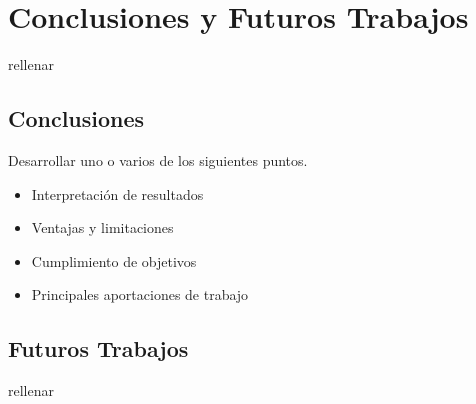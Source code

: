 \chapter{Conclusiones y Futuros Trabajos}	
\label{ch:conclusiones}
rellenar

\section{Conclusiones}

Desarrollar uno o varios de los siguientes puntos.

\begin{itemize}
    \item Interpretación de resultados
    \item Ventajas y limitaciones
    \item Cumplimiento de objetivos
    \item Principales aportaciones de trabajo    
\end{itemize}

\section{Futuros Trabajos}
rellenar
